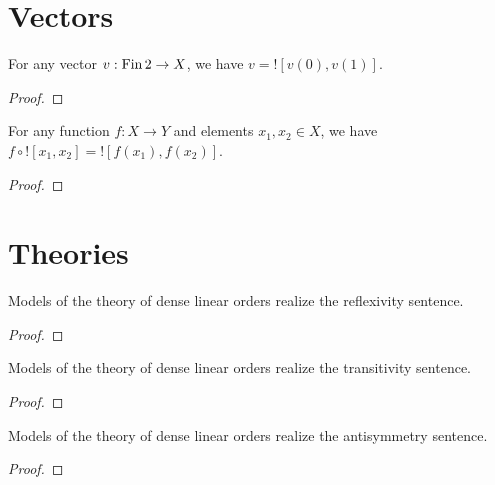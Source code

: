 
\section{Vectors}

\begin{lemma}
    \label{lem:vector-notation}
    \leanok
    For any vector $v : \operatorname{Fin} 2 \to X$, we have $v = ![v(0), v(1)]$.
\end{lemma}
\begin{proof}
    \leanok
\end{proof}

\begin{lemma}
    \label{lem:vector-notation-under-composition}
    \leanok
    For any function $f : X \to Y$ and elements $x_1, x_2 \in X$, we have $f \circ ![x_1, x_2] = ![f(x_1), f(x_2)]$.
\end{lemma}
\begin{proof}
    \leanok
\end{proof}


\section{Theories}

\begin{lemma}
    \label{lem:realize-reflexivity}
    \leanok
    Models of the theory of dense linear orders realize the reflexivity sentence.
\end{lemma}
\begin{proof}
    \leanok
\end{proof}

\begin{lemma}
    \label{lem:realize-transitivity}
    \leanok
    Models of the theory of dense linear orders realize the transitivity sentence.
\end{lemma}
\begin{proof}
    \leanok
\end{proof}

\begin{lemma}
    \label{lem:realize-antisymmetric}
    \leanok
    Models of the theory of dense linear orders realize the antisymmetry sentence.
\end{lemma}
\begin{proof}
    \leanok
\end{proof}

